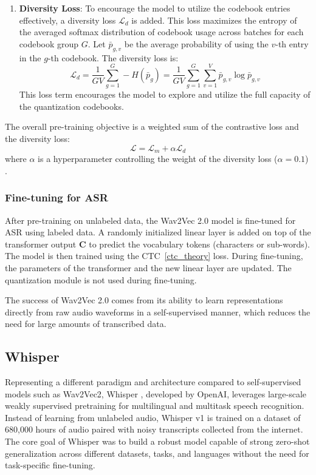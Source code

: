 \begin{enumerate}
    \item \textbf{Diversity Loss}: To encourage the model to utilize the codebook entries effectively, a diversity loss \( \mathcal{L}_d \) is added. This loss maximizes the entropy of the averaged softmax distribution of codebook usage across batches for each codebook group \( G \). Let \( \bar{p}_{g,v} \) be the average probability of using the \( v \)-th entry in the \( g \)-th codebook. The diversity loss is:
    \begin{equation} \label{eq:diversity_loss}
        \mathcal{L}_d = \frac{1}{GV} \sum_{g=1}^{G} -H(\bar{p}_g) = \frac{1}{GV} \sum_{g=1}^{G} \sum_{v=1}^{V} \bar{p}_{g,v} \log \bar{p}_{g,v}
    \end{equation}
    This loss term encourages the model to explore and utilize the full capacity of the quantization codebooks.
\end{enumerate}

The overall pre-training objective is a weighted sum of the contrastive loss and the diversity loss:
\begin{equation} \label{eq:total_pretrain_loss}
    \mathcal{L} = \mathcal{L}_m + \alpha \mathcal{L}_d
\end{equation}
where \( \alpha \) is a hyperparameter controlling the weight of the diversity loss (\( \alpha=0.1 \)) \cite{baevski2020wav2vec20frameworkselfsupervised}.

\subsubsection{Fine-tuning for ASR}

After pre-training on unlabeled data, the Wav2Vec 2.0 model is fine-tuned for ASR using labeled data. A randomly initialized linear layer is added on top of the transformer output \( \mathbf{C} \) to predict the vocabulary tokens (characters or sub-words). The model is then trained using the CTC~\ref{ctc_theory} loss. During fine-tuning, the parameters of the transformer and the new linear layer are updated. The quantization module is not used during fine-tuning.

The success of Wav2Vec 2.0 comes from its ability to learn representations directly from raw audio waveforms in a self-supervised manner, which reduces the need for large amounts of transcribed data.


\subsection{Whisper}
Representing a different paradigm and architecture compared to self-supervised models such as Wav2Vec2, Whisper \cite{radford2022robust}, developed by OpenAI, leverages large-scale weakly supervised pretraining for multilingual and multitask speech recognition. Instead of learning from unlabeled audio, Whisper v1 is trained on a dataset of 680,000 hours of audio paired with noisy transcripts collected from the internet. The core goal of Whisper was to build a robust model capable of strong zero-shot generalization across different datasets, tasks, and languages without the need for task-specific fine-tuning.

